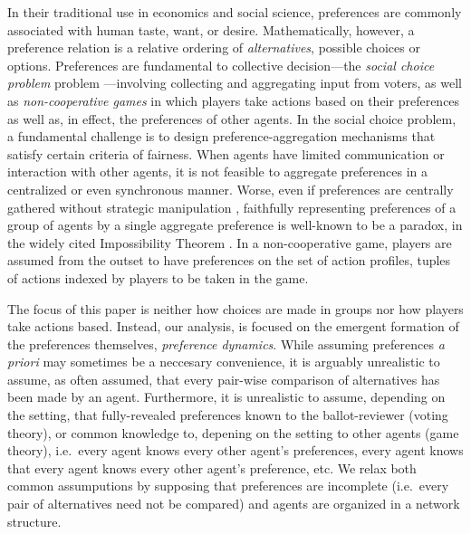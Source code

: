 \documentclass[conference]{ieeeconf}
\begin{document}
In their traditional use in economics and social science, preferences are commonly associated with human taste, want, or desire. Mathematically, however, a preference relation is a relative ordering of \emph{alternatives}, possible choices or options. Preferences are fundamental to collective decision---the \emph{social choice problem} problem \cite{choosingingroups}---involving collecting and aggregating input from voters, as well as \emph{non-cooperative games} \cite{gametheory} in which players take actions based on their preferences as well as, in effect, the preferences of other agents. In the social choice problem, a fundamental challenge is to design preference-aggregation mechanisms that satisfy certain criteria of fairness. When agents have limited communication or interaction with other agents, it is not feasible to aggregate preferences in a centralized or even synchronous manner. Worse, even if preferences are centrally gathered without strategic manipulation \cite{gibbard1973,satterthwaite1975}, faithfully representing preferences of a group of agents by a single aggregate preference is well-known to be a paradox, in the widely cited Impossibility Theorem \cite{arrow2012}. In a non-cooperative game, players are assumed from the outset to have preferences on the set of action profiles, tuples of actions indexed by players to be taken in the game. 

The focus of this paper is neither how choices are made in groups nor how players take actions based. Instead, our analysis, is focused on the emergent formation of the preferences themselves, \emph{preference dynamics}. While assuming preferences \emph{a priori} may sometimes be a neccesary convenience, it is arguably unrealistic to assume, as often assumed, that every pair-wise comparison of alternatives has been made by an agent. Furthermore, it is unrealistic to assume, depending on the setting, that fully-revealed preferences known to the ballot-reviewer (voting theory), or common knowledge to, depening on the setting to other agents (game theory), i.e.~every agent knows every other agent's preferences, every agent knows that every agent knows every other agent's preference, etc. We relax both common assumputions by supposing that preferences are incomplete (i.e.~every pair of alternatives need not be compared) and agents are organized in a network structure.
\end{document}
